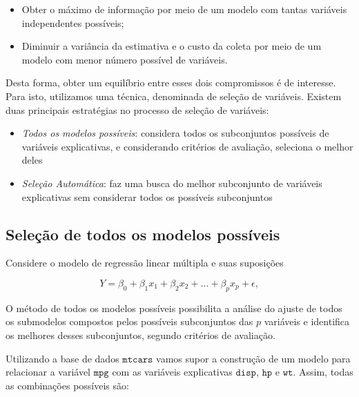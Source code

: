 \documentclass[
]{book}
\providecommand{\tightlist}{%
  \setlength{\itemsep}{0pt}\setlength{\parskip}{0pt}}
\begin{document}
\begin{itemize}
\tightlist
\item
  Obter o máximo de informação por meio de um modelo com tantas variáveis independentes possíveis;
\item
  Diminuir a variância da estimativa e o custo da coleta por meio de um modelo com menor número possível de variáveis.
\end{itemize}

Desta forma, obter um equilíbrio entre esses dois compromissos é de interesse. Para isto, utilizamos uma técnica, denominada de seleção de variáveis. Existem duas principais estratégias no processo de seleção de variáveis:

\begin{itemize}
\tightlist
\item
  \emph{Todos os modelos possíveis}: considera todos os subconjuntos possíveis de variáveis explicativas, e considerando critérios de avaliação, seleciona o melhor deles
\item
  \emph{Seleção Automática}: faz uma busca do melhor subconjunto de variáveis explicativas sem considerar todos os possíveis subconjuntos
\end{itemize}

\hypertarget{seleuxe7uxe3o-de-todos-os-modelos-possuxedveis}{%
\subsection{Seleção de todos os modelos possíveis}\label{seleuxe7uxe3o-de-todos-os-modelos-possuxedveis}}

Considere o modelo de regressão linear múltipla e suas suposições

\[Y=\beta_0+\beta_1 x_1+\beta_2 x_2+...+\beta_p x_p+\epsilon,\]

O método de todos os modelos possíveis possibilita a análise do ajuste de todos os submodelos compostos pelos possíveis subconjuntos das \(p\) variáveis e identifica os melhores desses subconjuntos, segundo critérios de avaliação.

Utilizando a base de dados \(\texttt{mtcars}\) vamos supor a construção de um modelo para relacionar a variável \(\texttt{mpg}\) com as variáveis explicativas \(\texttt{disp}\), \(\texttt{hp}\) e \(\texttt{wt}\). Assim, todas as combinações possíveis são:
\end{document}
